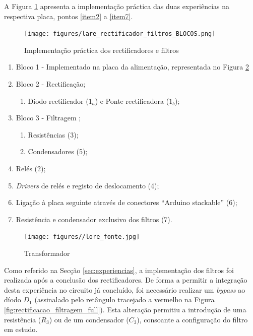 A Figura \ref{fig:placarectificadores} apresenta a implementação práctica das duas experiências na respectiva placa, pontos \ref{item2} a \ref{item7}. 

\begin{figure}[hbtp]
	\centering
	\texttt{[image: figures/lare\_rectificador\_filtros\_BLOCOS.png]}
	\caption{Implementação práctica dos rectificadores e filtros}
	\label{fig:placarectificadores}
\end{figure}

\begin{enumerate}
	\item Bloco 1 - Implementado na placa da alimentação, representada no Figura \ref{fig:placartransformador} 
	\item \label{item2}Bloco 2 - Rectificação;
		\begin{enumerate}
			\item \label{diodos}Díodo rectificador ($1_{a}$) e Ponte rectificadora ($1_{b}$);	
		\end{enumerate}
	\item Bloco 3 - Filtragem ;
		\begin{enumerate}
			\item \label{resistencias}Resistências (3);
			\item \label{condensadores}Condensadores (5);
		\end{enumerate}
	\item Relés (2);
	\item \textit{Drivers} de relés e registo de deslocamento (4);
	\item Ligação à placa seguinte através de conectores ``Arduino stackable'' (6);
	\item \label{item7}Resistência e condensador exclusivo dos filtros (7).
\end{enumerate}

\begin{figure}[hbtp]
	\centering
	\texttt{[image: figures//lore\_fonte.jpg]}
	\caption{Transformador}
	\label{fig:placartransformador}
\end{figure}

Como referido na Secção \ref{sec:experiencias}, a implementação dos filtros foi realizada após a conclusão dos rectificadores. De forma a permitir a integração desta experiência no circuito já concluído, foi necessário realizar um \textit{bypass} ao díodo $D_{1}$ (assinalado pelo retângulo tracejado a vermelho na Figura \ref{fig:rectificacao_filtragem_full}). Esta alteração permitiu a introdução de uma resistência ($R_{3}$) ou de um condensador ($C_{3}$), consoante a configuração do filtro em estudo.

